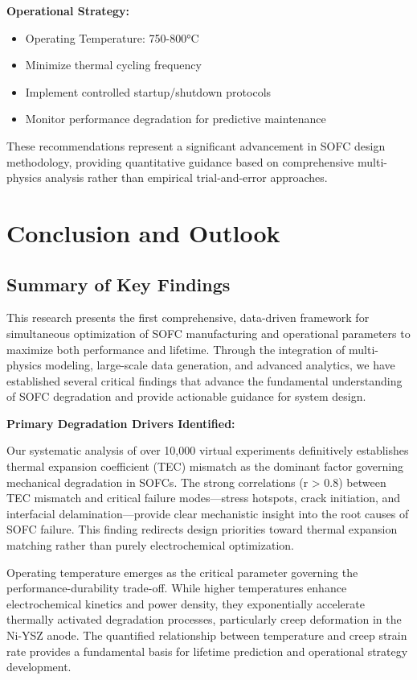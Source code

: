 \documentclass[conference]{IEEEtran}
\begin{document}
\textbf{Operational Strategy:}
\begin{itemize}
\item Operating Temperature: 750-800°C
\item Minimize thermal cycling frequency
\item Implement controlled startup/shutdown protocols
\item Monitor performance degradation for predictive maintenance
\end{itemize}

These recommendations represent a significant advancement in SOFC design methodology, providing quantitative guidance based on comprehensive multi-physics analysis rather than empirical trial-and-error approaches.

\section{Conclusion and Outlook}

\subsection{Summary of Key Findings}

This research presents the first comprehensive, data-driven framework for simultaneous optimization of SOFC manufacturing and operational parameters to maximize both performance and lifetime. Through the integration of multi-physics modeling, large-scale data generation, and advanced analytics, we have established several critical findings that advance the fundamental understanding of SOFC degradation and provide actionable guidance for system design.

\textbf{Primary Degradation Drivers Identified:}

Our systematic analysis of over 10,000 virtual experiments definitively establishes thermal expansion coefficient (TEC) mismatch as the dominant factor governing mechanical degradation in SOFCs. The strong correlations (r > 0.8) between TEC mismatch and critical failure modes—stress hotspots, crack initiation, and interfacial delamination—provide clear mechanistic insight into the root causes of SOFC failure. This finding redirects design priorities toward thermal expansion matching rather than purely electrochemical optimization.

Operating temperature emerges as the critical parameter governing the performance-durability trade-off. While higher temperatures enhance electrochemical kinetics and power density, they exponentially accelerate thermally activated degradation processes, particularly creep deformation in the Ni-YSZ anode. The quantified relationship between temperature and creep strain rate provides a fundamental basis for lifetime prediction and operational strategy development.
\end{document}
